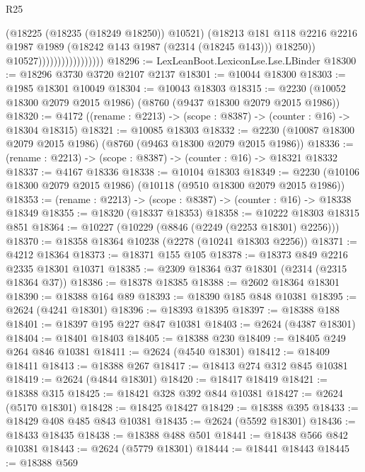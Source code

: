 \begin{lexlean}{R25}
\begin{coremodule}
                                        (@18225 (@18235 (@18249 @18250)) @10521)
                                        (@18213
                                          @181
                                          @118
                                          @2216
                                          @2216
                                          @1987
                                          @1989
                                          (@18242 @143 @1987 (@2314 (@18245 @143)))
                                          @18250))
                                      @10527)))))))))))))))))
@18296 := LexLeanBoot.LexiconLse.Lse.LBinder
@18300 := @18296 @3730 @3720 @2107 @2137
@18301 := @10044 @18300
@18303 := @1985 @18301 @10049
@18304 := @10043 @18303
@18315 := @2230 (@10052 @18300 @2079 @2015 @1986) (@8760 (@9437 @18300 @2079 @2015 @1986))
@18320 := @4172 ((rename : @2213) -> (scope : @8387) -> (counter : @16) -> @18304 @18315)
@18321 := @10085 @18303
@18332 := @2230 (@10087 @18300 @2079 @2015 @1986) (@8760 (@9463 @18300 @2079 @2015 @1986))
@18336 := (rename : @2213) -> (scope : @8387) -> (counter : @16) -> @18321 @18332
@18337 := @4167 @18336
@18338 := @10104 @18303
@18349 := @2230 (@10106 @18300 @2079 @2015 @1986) (@10118 (@9510 @18300 @2079 @2015 @1986))
@18353 := (rename : @2213) -> (scope : @8387) -> (counter : @16) -> @18338 @18349
@18355 := @18320 (@18337 @18353)
@18358 := @10222 @18303 @18315 @851
@18364 := @10227 (@10229 (@8846 (@2249 (@2253 @18301) @2256)))
@18370 := @18358 @18364 @10238 (@2278 (@10241 @18303 @2256))
@18371 := @4212 @18364
@18373 := @18371 @155 @105
@18378 := @18373 @849 @2216 @2335 @18301 @10371
@18385 := @2309 @18364 @37 @18301 (@2314 (@2315 @18364 @37))
@18386 := @18378 @18385
@18388 := @2602 @18364 @18301
@18390 := @18388 @164 @89
@18393 := @18390 @185 @848 @10381
@18395 := @2624 (@4241 @18301)
@18396 := @18393 @18395
@18397 := @18388 @188
@18401 := @18397 @195 @227 @847 @10381
@18403 := @2624 (@4387 @18301)
@18404 := @18401 @18403
@18405 := @18388 @230
@18409 := @18405 @249 @264 @846 @10381
@18411 := @2624 (@4540 @18301)
@18412 := @18409 @18411
@18413 := @18388 @267
@18417 := @18413 @274 @312 @845 @10381
@18419 := @2624 (@4844 @18301)
@18420 := @18417 @18419
@18421 := @18388 @315
@18425 := @18421 @328 @392 @844 @10381
@18427 := @2624 (@5170 @18301)
@18428 := @18425 @18427
@18429 := @18388 @395
@18433 := @18429 @408 @485 @843 @10381
@18435 := @2624 (@5592 @18301)
@18436 := @18433 @18435
@18438 := @18388 @488 @501
@18441 := @18438 @566 @842 @10381
@18443 := @2624 (@5779 @18301)
@18444 := @18441 @18443
@18445 := @18388 @569

\end{coremodule}
\end{lexlean}
